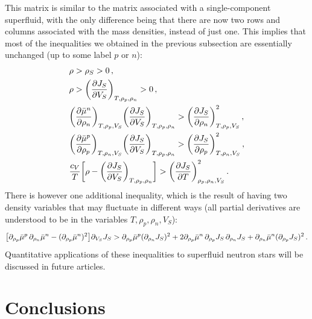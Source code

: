 \documentclass[a4paper, amsfonts, amssymb, amsmath, reprint, showkeys, nofootinbib, twoside,notitlepage,onecolumn]{revtex4-2}
\theoremstyle{definition}
\theoremstyle{theorem}
\theoremstyle{corollary}
\begin{document}
This matrix is similar to the matrix associated with a single-component superfluid, with the only difference being that there are now two rows and columns associated with the mass densities, instead of just one. This implies that most of the inequalities we obtained in the previous subsection are essentially unchanged (up to some label $p$ or $n$):
\vspace{-0.1cm}
\begin{equation}\label{neutronstore}
\begin{split}
& \rho > \rho_S >0 \, , \\
& \rho > \bigg(\dfrac{\partial J_S}{\partial V_S}\bigg)_{T,\rho_p,\rho_n} >0 \, , \\
& \bigg( \dfrac{\partial \Bar{\mu}^n}{\partial\rho_n}\bigg)_{T,\rho_p,V_S} \bigg(\dfrac{\partial J_S}{\partial V_S} \bigg)_{T,\rho_p,\rho_n} > \bigg(\dfrac{\partial J_S}{\partial \rho_n} \bigg)^2_{T,\rho_p,V_S} \, ,\\
& \bigg( \dfrac{\partial \Bar{\mu}^p}{\partial\rho_p}\bigg)_{T,\rho_n,V_S} \bigg(\dfrac{\partial J_S}{\partial V_S} \bigg)_{T,\rho_p,\rho_n} > \bigg(\dfrac{\partial J_S}{\partial \rho_p} \bigg)^2_{T,\rho_n,V_S} \, ,\\
& \dfrac{c_V}{T}\bigg[ \rho-\bigg(\dfrac{\partial J_S}{\partial V_S} \bigg)_{T,\rho_p,\rho_n} \bigg] > \bigg(\dfrac{\partial J_S}{\partial T} \bigg)^2_{\rho_p,\rho_n,V_S} \, . \\
\end{split}
\end{equation}
There is however one additional inequality, which is the result of having two density variables that may fluctuate in different ways (all partial derivatives are understood to be in the variables $T,\rho_p,\rho_n,V_S$):
\begin{equation}\label{neutronstore2}
\big[\partial_{\rho_p} \Bar{\mu}^p \, \partial_{\rho_n} \Bar{\mu}^n-(\partial_{\rho_p} \Bar{\mu}^n)^2\big]\partial_{V_S} J_S > \partial_{\rho_p} \Bar{\mu}^p (\partial_{\rho_n} J_S)^2+2 \partial_{\rho_p} \Bar{\mu}^n \, \partial_{\rho_p} J_S \, \partial_{\rho_n} J_S+\partial_{\rho_n} \Bar{\mu}^n (\partial_{\rho_p} J_S)^2\, .
\end{equation}
Quantitative applications of these inequalities to superfluid neutron stars will be discussed in future articles.


\section{Conclusions}
\end{document}
